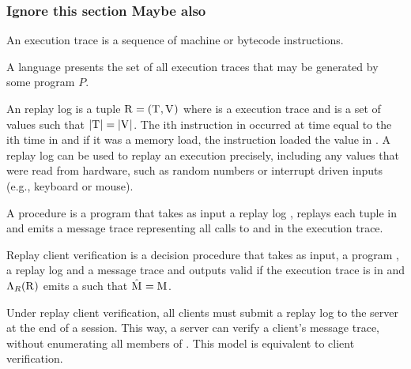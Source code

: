 \subsubsection{ Ignore this section Maybe also}

\begin{definition}
  An execution trace \execTrace{} is a sequence of machine or
  bytecode instructions.
\end{definition}

\begin{definition}
  A language  presents the set of all execution
  traces \execTrace{} that may be generated by some program $P$.
\end{definition}

\begin{definition}
  An replay log is a tuple $\mathrm{R}_{} = (\mathrm{T}_{},
  \mathrm{V}_{} )$ where \execTrace{} is a execution
  trace and \memoryTrace{} is a set of values such that
  $|\mathrm{T}_{}| = |\mathrm{V}_{}|$. The ith
  instruction in \execTrace{} occurred at time equal to the ith time
  in \clockTrace{} and if it was a memory load, the instruction loaded
  the value in \memoryTrace{}. A replay log can be used to replay an
  execution precisely, including any values that were read from
  hardware, such as random numbers or interrupt driven inputs (e.g.,
  keyboard or mouse).
\end{definition}

\begin{definition}
  A procedure \machine{} is a program that takes as input
  a replay log \replayLog{}, replays each tuple in \replayLog{}
  and emits a message trace \messageTrace{} representing all
  calls to \posixSend and \posixRecv in the execution trace.
\end{definition}

\begin{definition}
  Replay client verification is a decision procedure that takes as
  input, a program \program{}, a replay log \replayLog{} and a message
  trace \messageTrace{} and outputs valid if the execution trace
  \execTrace{} is in \lang{\program{}} and
  ${\Lambda}_{R}(\mathrm{R}_{})$ emits a \messageTraceAlt{} such that
  $\mathrm{\hat{M}_{}} = \mathrm{M}_{}$.
\end{definition}

Under replay client verification, all clients must submit a replay log
to the server at the end of a session. This way, a server can verify 
a client's message trace, without enumerating all members of
\msgLang{\program}. This model is equivalent to client verification.

